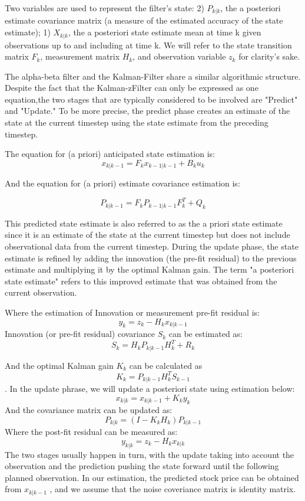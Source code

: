 Two variables are used to represent the filter's state: 2) $P_{k|k}$, the a posteriori estimate covariance matrix (a measure of the estimated accuracy of the state estimate); 1) $X_{k|k}$, the a posteriori state estimate mean at time k given observations up to and including at time k. We will refer to the state transition matrix $F_k$, measurement matrix $H_k$, and observation variable $z_k$ for clarity's sake. 

The alpha-beta filter and the Kalman-Filter share a similar algorithmic structure. Despite the fact that the Kalman-zFilter can only be expressed as one equation,the two stages that are typically considered to be involved are "Predict" and "Update." To be more precise, the predict phase creates an estimate of the state at the current timestep using the state estimate from the preceding timestep. 


The equation for (a priori) anticipated state estimation is:
$$x_{k|k-1}  =F_{k}x_{k-1|k-1}+B_{k}u_{k}$$

And the equation for (a priori) estimate covariance estimation is:

$$P_{k|k-1}=F_{k}P_{k-1|k-1}F_{k}^{T}+Q_{k}$$

This predicted state estimate is also referred to as the a priori state estimate since it is an estimate of the state at the current timestep but does not include observational data from the current timestep. During the update phase, the state estimate is refined by adding the innovation (the pre-fit residual) to the previous estimate and multiplying it by the optimal Kalman gain. The term "a posteriori state estimate" refers to this improved estimate that was obtained from the current observation.


Where the estimation of Innovation or measurement pre-fit residual is:
$$y_k=z_k-H_kx_{k|k-1} $$ 
Innovation (or pre-fit residual) covariance $S_k$ can be estimated as:
$$S_k=H_kP_{k|k-1}H_k^T+R_k $$


And the optimal Kalman gain $K_{k}$ can be calculated as 
$$K_k = P_{k|k-1}H_k^TS_{k-1}$$. 
In the update phrase, we will update a posteriori state using estimation below:
$$x_{k|k}=x_{k|k-1}  +K_ky_k$$
And the covariance matrix can be updated as:
$$P_{k|k}=(I-K_kH_k) P_{k|k-1}$$
Where the post-fit residual can be measured as: 
$$y_{k|k}=z_k-H_kx_{k|k}$$
The two stages usually happen in turn, with the update taking into account the observation and the prediction pushing the state forward until the following planned observation. In our estimation, the predicted stock price can be obtained from $x_{k|k-1}$ , and we assume that the noise coveriance matrix is identity matrix.


